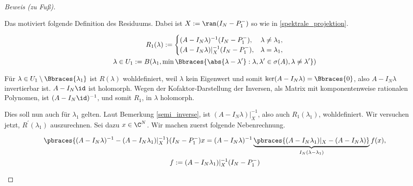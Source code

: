 \begin{proof}[Beweis (zu Fuß)]
\begin{enumerate}[label = (\roman*)]
        Das motiviert folgende Definition des Residuums.
        Dabei ist $X := \ran (I_N - P_1^-)$ so wie in \ref{spektrale_projektion}.

        \begin{multline*}
            R_1(\lambda)
            :=
            \begin{cases}
                (A - I_N \lambda)    ^{-1} (I_N - P_1^-), & \lambda \neq \lambda_1, \\
                (A - I_N \lambda) |_X^{-1} (I_N - P_1^-), & \lambda =    \lambda_1, \\
            \end{cases} \\
            \lambda
            \in
            U_1
            :=
            B
            (
                \lambda_1,
                \min
                \Bbraces
                {
                    \abs{\lambda - \lambda^\prime}:
                    \lambda, \lambda^\prime \in \sigma(A),
                    \lambda \neq \lambda^\prime
                }
            )
        \end{multline*}

        Für $\lambda \in U_1 \setminus \Bbraces{\lambda_1}$ ist $R(\lambda)$ wohldefiniert, weil $\lambda$ kein Eigenwert und somit $\ker (A - I_N \lambda) = \Bbraces{0}$, also $A - I_N \lambda$ invertierbar ist.
        $A - I_N \id$ ist holomorph.
        Wegen der Kofaktor-Darstellung der Inversen, als Matrix mit komponentenweise rationalen Polynomen, ist $(A - I_N \id)^{-1}$, und somit $R_1$, in $\lambda$ holomorph.

        Dies soll nun auch für $\lambda_1$ gelten.
        Laut Bemerkung \ref{semi_inverse}, ist $(A - I_N \lambda) |_X^{-1}$, also auch $R_1(\lambda_1)$, wohldefiniert.
        Wir versuchen jetzt, $R^\prime(\lambda_1)$ auszurechnen.
        Sei dazu $x \in \C^N$.
        Wir machen zuerst folgende Nebenrechnung.

        \begin{gather*}
            \pbraces
            {
                (A - I_N \lambda)^{-1}
                -
                (A - I_N \lambda_1) |_X^{-1}
            }
            (I_N - P_1^-)
            x
            =
            (A - I_N \lambda)^{-1}
            \underbrace
            {
                \pbraces
                {
                    (A - I_N \lambda_1) |_X
                    -
                    (A - I_N \lambda)
                }
            }_{
                I_N (\lambda - \lambda_1)
            }
            f(x), \\
            f
            :=
            (A - I_N \lambda_1) |_X^{-1}
            (I_N - P_1^-)
        \end{gather*}


\end{enumerate}
\end{proof}
